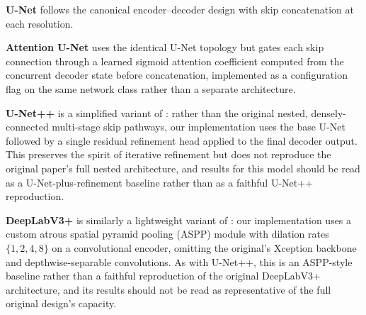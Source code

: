 \documentclass[10pt,twocolumn]{article}
\begin{document}
\textbf{U-Net} \citep{ronneberger2015unet} follows the canonical encoder--decoder design with skip concatenation at each resolution.

\textbf{Attention U-Net} \citep{oktay2018attention} uses the identical U-Net topology but gates each skip connection through a learned sigmoid attention coefficient computed from the concurrent decoder state before concatenation, implemented as a configuration flag on the same network class rather than a separate architecture.

\textbf{U-Net++} is a simplified variant of \citet{zhou2018unetpp}: rather than the original nested, densely-connected multi-stage skip pathways, our implementation uses the base U-Net followed by a single residual refinement head applied to the final decoder output. This preserves the spirit of iterative refinement but does not reproduce the original paper's full nested architecture, and results for this model should be read as a U-Net-plus-refinement baseline rather than as a faithful U-Net++ reproduction.

\textbf{DeepLabV3+} is similarly a lightweight variant of \citet{chen2018deeplabv3plus}: our implementation uses a custom atrous spatial pyramid pooling (ASPP) module with dilation rates $\{1, 2, 4, 8\}$ on a convolutional encoder, omitting the original's Xception backbone and depthwise-separable convolutions. As with U-Net++, this is an ASPP-style baseline rather than a faithful reproduction of the original DeepLabV3+ architecture, and its results should not be read as representative of the full original design's capacity.
\end{document}

